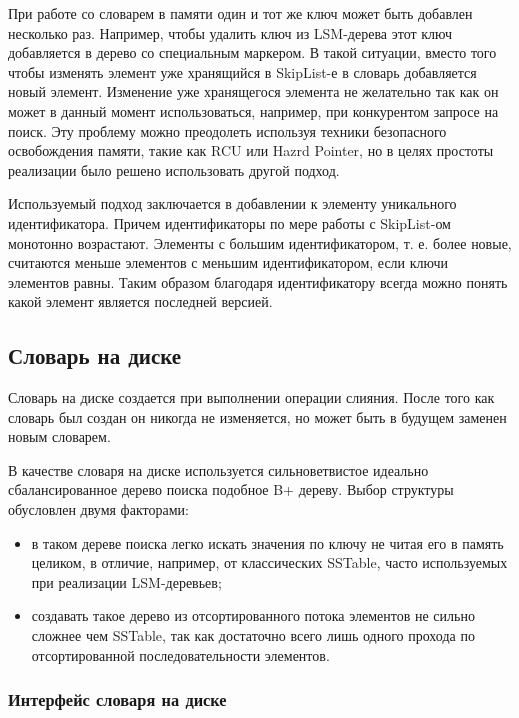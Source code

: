 При работе со словарем в памяти один и тот же ключ может быть добавлен несколько
раз. Например, чтобы удалить ключ из LSM-дерева этот ключ добавляется в дерево
со специальным маркером. В такой ситуации, вместо того чтобы изменять элемент
уже хранящийся в SkipList-е в словарь добавляется новый элемент. Изменение уже
хранящегося элемента не желательно так как он может в данный момент
использоваться, например, при конкурентом запросе на поиск. Эту проблему можно
преодолеть используя техники безопасного освобождения памяти, такие как RCU или
Hazrd Pointer, но в целях простоты реализации было решено использовать другой
подход.

Используемый подход заключается в добавлении к элементу уникального
идентификатора. Причем идентификаторы по мере работы с SkipList-ом монотонно
возрастают. Элементы с большим идентификатором, т. е. более новые, считаются
меньше элементов с меньшим идентификатором, если ключи элементов равны. Таким
образом благодаря идентификатору всегда можно понять какой элемент является
последней версией.


\subsection{Словарь на диске}

Словарь на диске создается при выполнении операции слияния. После того как
словарь был создан он никогда не изменяется, но может быть в будущем заменен
новым словарем.

В качестве словаря на диске используется сильноветвистое идеально
сбалансированное дерево поиска подобное B+ дереву. Выбор структуры обусловлен
двумя факторами:
\begin{itemize}
  \item в таком дереве поиска легко искать значения по ключу не читая его в
        память целиком, в отличие, например, от классических SSTable,
        часто используемых при реализации LSM-деревьев;
  \item создавать такое дерево из отсортированного потока элементов не сильно
        сложнее чем SSTable, так как достаточно всего лишь одного прохода по
        отсортированной последовательности элементов.
\end{itemize}


\subsubsection{Интерфейс словаря на диске}


